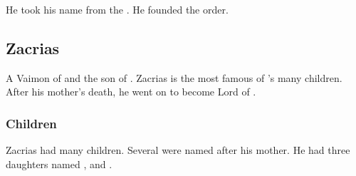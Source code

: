 He took his name from the . 
He founded the  order. 















\section{Zacrias}
A Vaimon of \ClanGeican and the son of \Belzir. 
Zacrias is the most famous of \Belzir's many children. 
After his mother's death, he went on to become Lord of \ClanGeican. 









\subsection{Children}
Zacrias had many children. 
Several were named after his mother. 
He had three daughters named \Belzir, \Delphine{} and \Shiaraid. 












































\chapter{\ClanRedcor}















